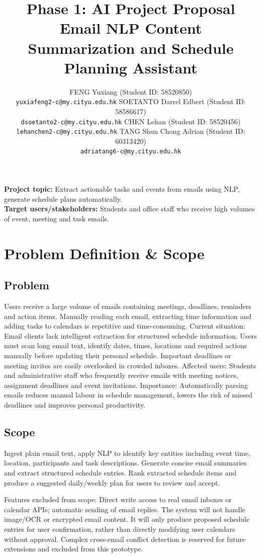 \documentclass{article}
\title{Phase 1: AI Project Proposal\\
\large Email NLP Content Summarization and Schedule Planning Assistant}
\author{
  FENG Yuxiang (Student ID: 58520850)\\
  \texttt{yuxiafeng2-c@my.cityu.edu.hk}
  \And 
  SOETANTO Darrel Edbert (Student ID: 58586617)\\
  \texttt{dsoetanto2-c@my.cityu.edu.hk}
  \AND
  CHEN Lehan (Student ID: 58520456)\\
  \texttt{lehanchen2-c@my.cityu.edu.hk}
  \And
  TANG Shun Chong Adrian (Student ID: 60313420)\\
  \texttt{adriatang6-c@my.cityu.edu.hk}
}
\begin{document}
\maketitle
\noindent\textbf{Project topic:} Extract actionable tasks and events from emails using NLP, generate schedule plans automatically.\\
\textbf{Target users/stakeholders:} Students and office staff who receive high volumes of event, meeting and task emails.
\section{Problem Definition \& Scope}
\subsection{Problem}
Users receive a large volume of emails containing meetings, deadlines, reminders and action items. Manually reading each email, extracting time information and adding tasks to calendars is repetitive and time-consuming.
Current situation: Email clients lack intelligent extraction for structured schedule information. Users must scan long email text, identify dates, times, locations and required actions manually before updating their personal schedule. Important deadlines or meeting invites are easily overlooked in crowded inboxes.
Affected users: Students and administrative staff who frequently receive emails with meeting notices, assignment deadlines and event invitations.
Importance: Automatically parsing emails reduces manual labour in schedule management, lowers the risk of missed deadlines and improves personal productivity.
\subsection{Scope}
Ingest plain email text, apply NLP to identify key entities including event time, location, participants and task descriptions. Generate concise email summaries and extract structured schedule entries. Rank extracted schedule items and produce a suggested daily/weekly plan for users to review and accept.

Features excluded from scope:
Direct write access to real email inboxes or calendar APIs; automatic sending of email replies. The system will not handle image/OCR or encrypted email content. It will only produce proposed schedule entries for user confirmation, rather than directly modifying user calendars without approval. Complex cross-email conflict detection is reserved for future extensions and excluded from this prototype.
\end{document}
